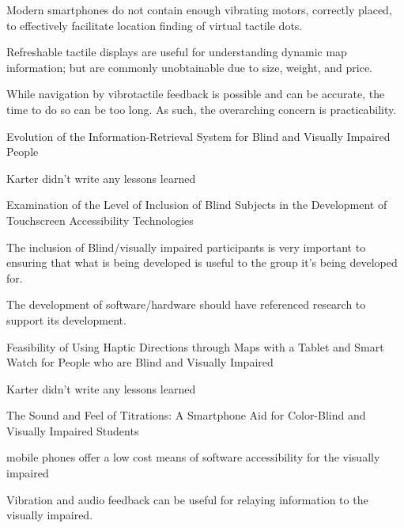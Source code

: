 \documentclass{article}
\begin{document}
Modern smartphones do not contain enough vibrating motors, correctly placed, to effectively facilitate location finding of virtual tactile dots. 

Refreshable tactile displays are useful for understanding dynamic map information; but are commonly unobtainable due to size, weight, and price. 

While navigation by vibrotactile feedback is possible and can be accurate, the time to do so can be too long. As such, the overarching concern is practicability. 

Evolution of the Information-Retrieval System for Blind and Visually Impaired People 

Karter didn’t write any lessons learned 

Examination of the Level of Inclusion of Blind Subjects in the Development of Touchscreen Accessibility Technologies 

The inclusion of Blind/visually impaired participants is very important to ensuring that what is being developed is useful to the group it's being developed for. 

The development of software/hardware should have referenced research to support its development. 

Feasibility of Using Haptic Directions through Maps with a Tablet and Smart Watch for People who are Blind and Visually Impaired 

Karter didn’t write any lessons learned 

The Sound and Feel of Titrations: A Smartphone Aid for Color-Blind and Visually Impaired Students 

mobile phones offer a low cost means of software accessibility for the visually impaired  

Vibration and audio feedback can be useful for relaying information to the visually impaired. 




\end{document}

